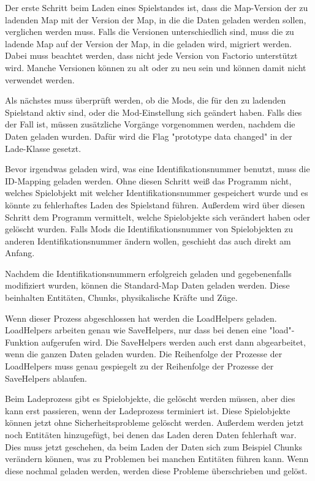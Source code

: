 Der erste Schritt beim Laden eines Spielstandes ist, dass die Map-Version der zu ladenden Map mit der Version der Map, in die die Daten geladen werden sollen, verglichen werden muss. Falls die Versionen unterschiedlich sind, muss die zu ladende Map auf der Version der Map, in die geladen wird, migriert werden. Dabei muss beachtet werden, dass nicht jede Version von Factorio unterstützt wird. Manche Versionen können zu alt oder zu neu sein und können damit nicht verwendet werden.\cite{factorioGithubSaveLoad}

Als nächstes muss überprüft werden, ob die Mods, die für den zu ladenden Spielstand aktiv sind, oder die Mod-Einstellung sich geändert haben. Falls dies der Fall ist, müssen zusätzliche Vorgänge vorgenommen werden, nachdem die Daten geladen wurden. Dafür wird die Flag "prototype data changed" in der Lade-Klasse gesetzt.\cite{factorioGithubSaveLoad}

Bevor irgendwas geladen wird, was eine Identifikationsnummer benutzt, muss die ID-Mapping geladen werden. Ohne diesen Schritt weiß das Programm nicht, welches Spielobjekt mit welcher Identifikationsnummer gespeichert wurde und es könnte zu fehlerhaftes Laden des Spielstand führen. Außerdem wird über diesen Schritt dem Programm vermittelt, welche Spielobjekte sich verändert haben oder gelöscht wurden. Falls Mods die Identifikationsnummer von Spielobjekten zu anderen Identifikationsnummer ändern wollen, geschieht das auch direkt am Anfang.\cite{factorioGithubSaveLoad}

Nachdem die Identifikationsnummern erfolgreich geladen und gegebenenfalls modifiziert wurden, können die Standard-Map Daten geladen werden. Diese beinhalten Entitäten, Chunks, physikalische Kräfte und Züge.\cite{factorioGithubSaveLoad}

Wenn dieser Prozess abgeschlossen hat werden die LoadHelpers geladen. LoadHelpers arbeiten genau wie SaveHelpers, nur dass bei denen eine "load"-Funktion aufgerufen wird. Die SaveHelpers werden auch erst dann abgearbeitet, wenn die ganzen Daten geladen wurden. Die Reihenfolge der Prozesse der LoadHelpers muss genau gespiegelt zu der Reihenfolge der Prozesse der SaveHelpers ablaufen.\cite{factorioGithubSaveLoad}

Beim Ladeprozess gibt es Spielobjekte, die gelöscht werden müssen, aber dies kann erst passieren, wenn der Ladeprozess terminiert ist. Diese Spielobjekte können jetzt ohne Sicherheitsprobleme gelöscht werden. Außerdem werden jetzt noch Entitäten hinzugefügt, bei denen das Laden deren Daten fehlerhaft war. Dies muss jetzt geschehen, da beim Laden der Daten sich zum Beispiel Chunks verändern können, was zu Problemen bei manchen Entitäten führen kann. Wenn diese nochmal geladen werden, werden diese Probleme überschrieben und gelöst.\cite{factorioGithubSaveLoad}

